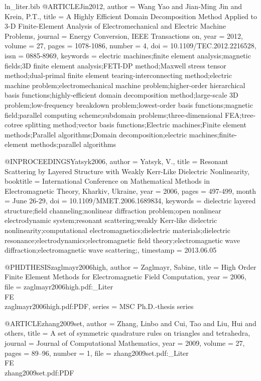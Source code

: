 \begin{filecontents*}{ln_liter.bib}
@ARTICLE{Jin2012,
  author = {Wang Yao and Jian-Ming Jin and Krein, P.T.},
  title = {A Highly Efficient Domain Decomposition Method Applied to {3-D} Finite-Element
	Analysis of Electromechanical and Electric Machine Problems},
  journal = {Energy Conversion, IEEE Transactions on},
  year = {2012},
  volume = {27},
  pages = {1078-1086},
  number = {4},
  doi = {10.1109/TEC.2012.2216528},
  issn = {0885-8969},
  keywords = {electric machines;finite element analysis;magnetic fields;3D finite
	element analysis;FETI-DP method;{M}axwell stress tensor method;dual-primal
	finite element tearing-interconnecting method;electric machine problem;electromechanical
	machine problem;higher-order hierarchical basis functions;highly-efficient
	domain decomposition method;large-scale 3D problem;low-frequency
	breakdown problem;lowest-order basis functions;magnetic field;parallel
	computing scheme;subdomain problems;three-dimensional FEA;tree-cotree
	splitting method;vector basis functions;Electric machines;Finite
	element methods;Parallel algorithms;Domain decomposition;electric
	machines;finite-element methods;parallel algorithms}
}

@INPROCEEDINGS{Yatsyk2006,
  author = {Yatsyk, V.},
  title = {Resonant Scattering by Layered Structure with Weakly {K}err-Like
	Dielectric Nonlinearity},
  booktitle = {International Conference on Mathematical Methods in Electromagnetic
	Theory, Kharkiv, Ukraine},
  year = {2006},
  pages = {497-499},
  month = {June 26-29},
  doi = {10.1109/MMET.2006.1689834},
  keywords = {dielectric layered structure;field channeling;nonlinear diffraction
	problem;open nonlinear electrodynamic system;resonant scattering;weakly
	Kerr-like dielectric nonlinearity;computational electromagnetics;dielectric
	materials;dielectric resonance;electrodynamics;electromagnetic field
	theory;electromagnetic wave diffraction;electromagnetic wave scattering;},
  timestamp = {2013.06.05}
}

@PHDTHESIS{zaglmayr2006high,
  author = {Zaglmayr, Sabine},
  title = {High Order Finite Element Methods for Electromagnetic Field Computation},
  year = {2006},
  file = {zaglmayr2006high.pdf:_Liter\\FE\\zaglmayr2006high.pdf:PDF},
  series = {MSC Ph.D.-thesis series}
}

@ARTICLE{zhang2009set,
  author = {Zhang, Linbo and Cui, Tao and Liu, Hui and others},
  title = {A set of symmetric quadrature rules on triangles and tetrahedra},
  journal = {Journal of Computational Mathematics},
  year = {2009},
  volume = {27},
  pages = {89--96},
  number = {1},
  file = {zhang2009set.pdf:_Liter\\FE\\zhang2009set.pdf:PDF}
}


\end{filecontents*}

